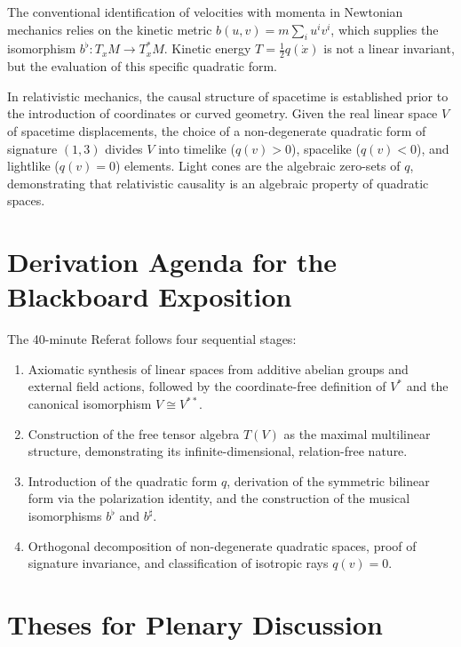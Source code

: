 \documentclass[11pt,a4paper]{article}
\begin{document}
The conventional identification of velocities with momenta in Newtonian
mechanics relies on the kinetic metric $b(u, v) = m \sum_i u^i v^i$, which
supplies the isomorphism $b^\flat : T_x M \to T_x^* M$.
Kinetic energy $T = \frac{1}{2} q(\dot{x})$ is not a linear invariant, but the
evaluation of this specific quadratic form.

In relativistic mechanics, the causal structure of spacetime is established
prior to the introduction of coordinates or curved geometry.
Given the real linear space $V$ of spacetime displacements, the choice of a
non-degenerate quadratic form of signature $(1, 3)$ divides $V$ into timelike
($q(v) > 0$), spacelike ($q(v) < 0$), and lightlike ($q(v) = 0$) elements.
Light cones are the algebraic zero-sets of $q$, demonstrating that relativistic
causality is an algebraic property of quadratic spaces.

\section{Derivation Agenda for the Blackboard Exposition}
\label{sec:agenda}

The 40-minute Referat follows four sequential stages:
\begin{enumerate}
  \item Axiomatic synthesis of linear spaces from additive abelian groups and
    external field actions, followed by the coordinate-free definition of $V^*$
    and the canonical isomorphism $V \cong V^{**}$.
  \item Construction of the free tensor algebra $T(V)$ as the maximal
    multilinear structure, demonstrating its infinite-dimensional, relation-free
    nature.
  \item Introduction of the quadratic form $q$, derivation of the symmetric
    bilinear form via the polarization identity, and the construction of the
    musical isomorphisms $b^\flat$ and $b^\sharp$.
  \item Orthogonal decomposition of non-degenerate quadratic spaces, proof of
    signature invariance, and classification of isotropic rays $q(v) = 0$.
\end{enumerate}

\section{Theses for Plenary Discussion}
\label{sec:theses}
\end{document}
